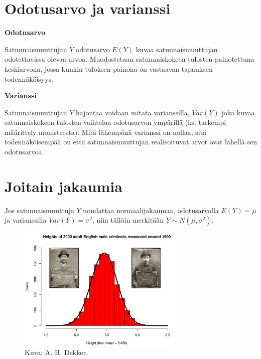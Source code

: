 \documentclass[
]{report}
\begin{document}
\hypertarget{odotusarvo-ja-varianssi}{%
\section{Odotusarvo ja varianssi}\label{odotusarvo-ja-varianssi}}

\begin{defblock}{}
\textbf{Odotusarvo}

Satunnaismuuttujan \(Y\) odotusarvo \(E(Y)\) kuvaa satunnaismuuttujan
odotettavissa olevaa arvoa. Muodostetaan satunnaiskokeen tulosten
painotettuna keskiarvona, jossa kunkin tuloksen painona on vastaavan
tapauksen todennäköisyys.

\end{defblock}

\begin{defblock}{}
\textbf{Varianssi}

Satunnaismuuttujan \(Y\) hajontaa voidaan mitata varianssilla,
\(Var(Y)\) joka kuvaa satunnaiskokeen tulosten vaihtelua odotusarvon
ympärillä (ks. tarkempi määrittely monisteesta). Mitä lähempänä
varianssi on nollaa, sitä todennäköisempää on että satunnaismuuttujan
realisoituvat arvot ovat lähellä sen odotusarvoa.

\end{defblock}

\hypertarget{joitain-jakaumia}{%
\section{Joitain jakaumia}\label{joitain-jakaumia}}

Jos satunnaismuuttuja \(Y\) noudattaa normaalijakaumaa, odotusarvolla
\(E(Y) = \mu\) ja varianssilla \(Var(Y) = \sigma^2\), niin tällöin
merkitään \(Y \sim N(\mu,\sigma^2)\).

\begin{figure}

{\centering \includegraphics[width=3.10417in,height=\textheight]{heightofcriminal.jpg}

}

\caption{Kuva: A. H. Dekker.}

\end{figure}
\end{document}
